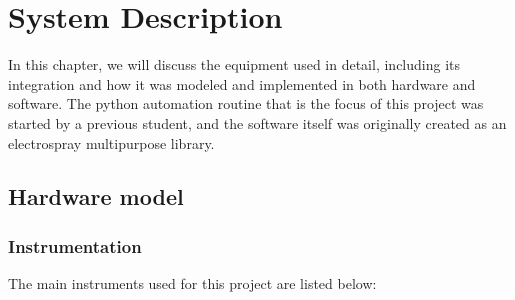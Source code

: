 \chapter{System Description}
\label{chap:system_description}

In this chapter, we will discuss the equipment used in detail, including its integration and how it was modeled and implemented in both hardware and software. 
The python automation routine that is the focus of this project was started by a previous student\cite{Monica}, and the software itself was originally created as an electrospray multipurpose library.

\section{Hardware model}
\label{sec:hardware_model}

\subsection{Instrumentation}
\label{subsec:instrumentation}

The main instruments used for this project are listed below:

